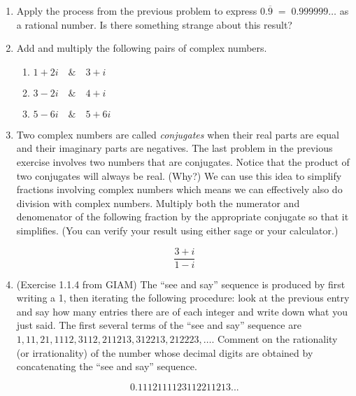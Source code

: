 \documentclass{amsart}
\begin{document}
\begin{enumerate}
\newpage

\item Apply the process from the previous problem to express $0.\overline{9} \; = \; 0.999999\ldots$ as a rational number.  Is there something strange about this result?

\vfill

\vfill

\item Add and multiply the following pairs of complex numbers.

\begin{enumerate}
\item \rule{0pt}{36pt} $ 1 + 2i \quad \& \quad 3 + i $
\item \rule{0pt}{36pt} $ 3 - 2i \quad \& \quad 4 + i $
\item \rule{0pt}{36pt} $ 5 - 6i \quad \& \quad 5 + 6i $
\end{enumerate}

\vfill

\newpage

\item Two complex numbers are called {\em conjugates} when their real parts are equal and their imaginary parts are negatives.  The last problem in the previous exercise involves two numbers that are conjugates.  Notice that the product of two conjugates will always be real.  (Why?) We can use this idea to simplify fractions involving complex numbers which means we can effectively also do division with complex numbers.  Multiply both the numerator and denomenator of the following fraction by the appropriate conjugate so that it simplifies.  (You can verify your result using either sage or your calculator.)

\[ \frac{3+i}{1-i} \]

\vfill

\item (Exercise 1.1.4 from GIAM) The ``see and say'' sequence is produced by first writing a 1, 
then iterating the following procedure:  look at the previous entry 
and say how many entries there are of each integer and write down what 
you just said.  The first several terms of the ``see and say'' sequence 
are $1, 11, 21, 1112, 3112, 211213, 312213, 212223, \ldots$.  Comment on the
rationality (or irrationality) of the number whose decimal digits are obtained 
by concatenating the ``see and say'' sequence.

\[ 0.1112111123112211213... \]

\vfill


\end{enumerate}
\end{document}
